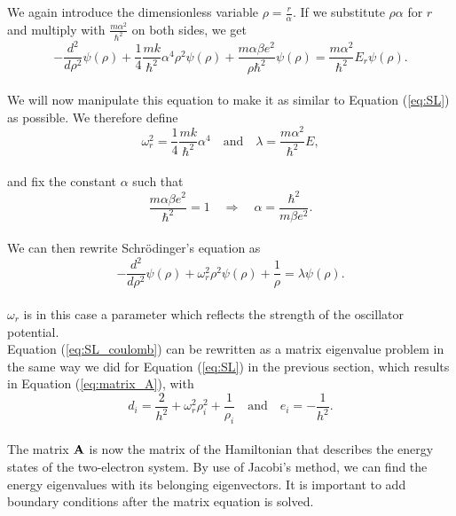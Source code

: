 \documentclass[12pt]{article}
\begin{document}
\begin{flushleft}
\vspace{5mm}
We again introduce the dimensionless variable $\rho = \frac{r}{\alpha}$. If we substitute $\rho\alpha$ for $r$ and multiply with $\frac{m\alpha^2}{\hbar^2}$ on both sides, we get\\
\vspace{5mm}
$$-\frac{d^2}{d\rho^2} \psi(\rho) 
       + \frac{1}{4}\frac{mk}{\hbar^2} \alpha^4\rho^2\psi(\rho)+\frac{m\alpha \beta e^2}{\rho\hbar^2}\psi(\rho)  = 
\frac{m\alpha^2}{\hbar^2}E_r \psi(\rho).$$\\
\vspace{5mm}
We will now manipulate this equation to make it as similar to Equation (\ref{eq:SL}) as possible. We therefore define\\ 
\vspace{5mm}
$$\omega_r^2=\frac{1}{4}\frac{mk}{\hbar^2} \alpha^4\quad\text{and}\quad \lambda = \frac{m\alpha^2}{\hbar^2}E,$$\\
\vspace{5mm}
and fix the constant $\alpha$ such that\\ 
\vspace{5mm}
$$\frac{m\alpha \beta e^2}{\hbar^2}=1\quad\Rightarrow\quad \alpha = \frac{\hbar^2}{m\beta e^2}.$$\\
\vspace{5mm}
We can then rewrite Schr\"odinger's equation as\\
\vspace{5mm}
\begin{equation}\label{eq:SL_coulomb}
-\frac{d^2}{d\rho^2} \psi(\rho) + \omega_r^2\rho^2\psi(\rho) +\frac{1}{\rho} = \lambda \psi(\rho).
\end{equation}\\
\vspace{5mm}
$\omega_r$ is in this case a parameter which reflects the strength of the oscillator potential.\\
\newpage
Equation (\ref{eq:SL_coulomb}) can be rewritten as a matrix eigenvalue problem in the same way we did for Equation (\ref{eq:SL}) in the previous section, which results in Equation (\ref{eq:matrix_A}), with\\
\vspace{5mm}
$$d_i=\frac{2}{h^2}+\omega_r^2\rho_{i}^2+\frac{1}{\rho_{i}}\quad\text{and}\quad e_i=-\frac{1}{h^2}.$$\\
\vspace{5mm}
The matrix $\bf A$ is now the matrix of the Hamiltonian that describes the energy states of the two-electron system. By use of Jacobi's method, we can find the energy eigenvalues with its belonging eigenvectors. It is important to add boundary conditions after the matrix equation is solved.\\


\end{flushleft}
\end{document}
